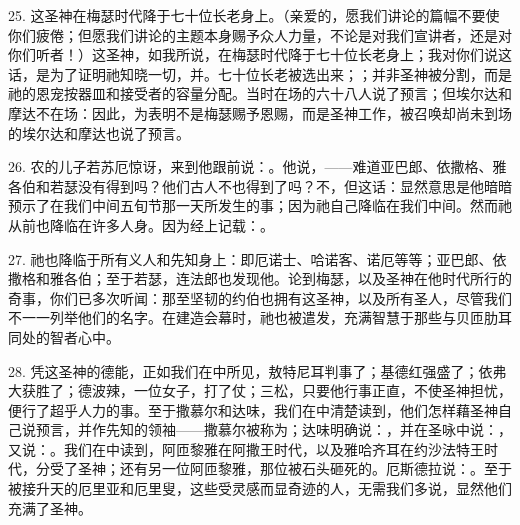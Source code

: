 25. 这圣神在梅瑟时代降于七十位长老身上。（亲爱的，愿我们讲论的篇幅不要使你们疲倦；但愿我们讲论的主题本身赐予众人力量，不论是对我们宣讲者，还是对你们听者！）这圣神，如我所说，在梅瑟时代降于七十位长老身上；我对你们说这话，是为了证明祂知晓一切，并。七十位长老被选出来；；并非圣神被分割，而是祂的恩宠按器皿和接受者的容量分配。当时在场的六十八人说了预言；但埃尔达和摩达不在场：因此，为表明不是梅瑟赐予恩赐，而是圣神工作，被召唤却尚未到场的埃尔达和摩达也说了预言。\par

26. 农的儿子若苏厄惊讶，来到他跟前说：。他说，——难道亚巴郎、依撒格、雅各伯和若瑟没有得到吗？他们古人不也得到了吗？不，但这话：显然意思是他暗暗预示了在我们中间五旬节那一天所发生的事；因为祂自己降临在我们中间。然而祂从前也降临在许多人身。因为经上记载：。\par

27. 祂也降临于所有义人和先知身上：即厄诺士、哈诺客、诺厄等等；亚巴郎、依撒格和雅各伯；至于若瑟，连法郎也发现他。论到梅瑟，以及圣神在他时代所行的奇事，你们已多次听闻：那至坚韧的约伯也拥有这圣神，以及所有圣人，尽管我们不一一列举他们的名字。在建造会幕时，祂也被遣发，充满智慧于那些与贝匝肋耳同处的智者心中。\par

28. 凭这圣神的德能，正如我们在中所见，敖特尼耳判事了；基德红强盛了；依弗大获胜了；德波辣，一位女子，打了仗；三松，只要他行事正直，不使圣神担忧，便行了超乎人力的事。至于撒慕尔和达味，我们在中清楚读到，他们怎样藉圣神自己说预言，并作先知的领袖——撒慕尔被称为；达味明确说：，并在圣咏中说：，又说：。我们在中读到，阿匝黎雅在阿撒王时代，以及雅哈齐耳在约沙法特王时代，分受了圣神；还有另一位阿匝黎雅，那位被石头砸死的。厄斯德拉说：。至于被接升天的厄里亚和厄里叟，这些受灵感而显奇迹的人，无需我们多说，显然他们充满了圣神。\par

